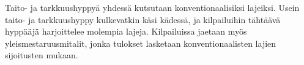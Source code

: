 Taito- ja tarkkuushyppyä yhdessä kutsutaan konventionaalisiksi lajeiksi. Usein taito- ja tarkkuushyppy kulkevatkin käsi kädessä, ja kilpailuihin tähtäävä hyppääjä harjoittelee molempia lajeja. Kilpailuissa jaetaan myös yleismestaruusmitalit, jonka tulokset lasketaan konventionaalisten lajien sijoitusten mukaan. 

